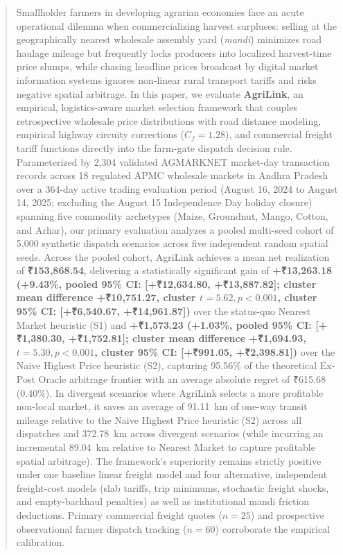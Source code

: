 \documentclass[journal]{IEEEtran}
\begin{document}
\begin{abstract}
Smallholder farmers in developing agrarian economies face an acute operational dilemma when commercializing harvest surpluses: selling at the geographically nearest wholesale assembly yard (\textit{mandi}) minimizes road haulage mileage but frequently locks producers into localized harvest-time price slumps, while chasing headline prices broadcast by digital market information systems ignores non-linear rural transport tariffs and risks negative spatial arbitrage. In this paper, we evaluate \textbf{AgriLink}, an empirical, logistics-aware market selection framework that couples retrospective wholesale price distributions with road distance modeling, empirical highway circuity corrections ($C_f = 1.28$), and commercial freight tariff functions directly into the farm-gate dispatch decision rule. Parameterized by 2,304 validated AGMARKNET market-day transaction records across 18 regulated APMC wholesale markets in Andhra Pradesh over a 364-day active trading evaluation period (August 16, 2024 to August 14, 2025; excluding the August 15 Independence Day holiday closure) spanning five commodity archetypes (Maize, Groundnut, Mango, Cotton, and Arhar), our primary evaluation analyzes a pooled multi-seed cohort of 5,000 synthetic dispatch scenarios across five independent random spatial seeds. Across the pooled cohort, AgriLink achieves a mean net realization of \textbf{₹153,868.54}, delivering a statistically significant gain of \textbf{+₹13,263.18 (+9.43\%, pooled 95\% CI: [+₹12,634.80, +₹13,887.82]; cluster mean difference +₹10,751.27, cluster $t = 5.62, p < 0.001$, cluster 95\% CI: [+₹6,540.67, +₹14,961.87])} over the status-quo Nearest Market heuristic (S1) and \textbf{+₹1,573.23 (+1.03\%, pooled 95\% CI: [+₹1,380.30, +₹1,752.81]; cluster mean difference +₹1,694.93, $t = 5.30, p < 0.001$, cluster 95\% CI: [+₹991.05, +₹2,398.81])} over the Naive Highest Price heuristic (S2), capturing 95.56\% of the theoretical Ex-Post Oracle arbitrage frontier with an average absolute regret of ₹615.68 (0.40\%). In divergent scenarios where AgriLink selects a more profitable non-local market, it saves an average of 91.11~km of one-way transit mileage relative to the Naive Highest Price heuristic (S2) across all dispatches and 372.78~km across divergent scenarios (while incurring an incremental 89.04~km relative to Nearest Market to capture profitable spatial arbitrage). The framework's superiority remains strictly positive under one baseline linear freight model and four alternative, independent freight-cost models (slab tariffs, trip minimums, stochastic freight shocks, and empty-backhaul penalties) as well as institutional mandi friction deductions. Primary commercial freight quotes ($n = 25$) and prospective observational farmer dispatch tracking ($n = 60$) corroborate the empirical calibration.
\end{abstract}
\end{document}
